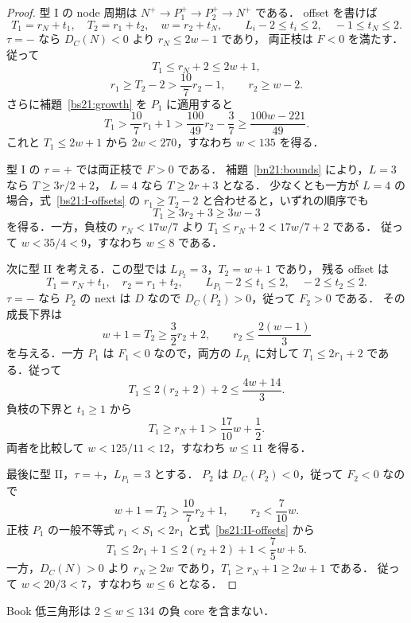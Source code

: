 \begin{proof}
型 I の node 周期は $N^+\to P_1^+\to P_2^+\to N^+$ である．
offset を書けば
\begin{equation}\label{bs21:I-offsets}
 T_1=r_N+t_1,\quad T_2=r_1+t_2,\quad w=r_2+t_N,
 \qquad
 L_i-2\le t_i\le2,\quad-1\le t_N\le2.
\end{equation}
$\tau=-$ なら $D_C(N)<0$ より $r_N\le2w-1$ であり，
両正枝は $F<0$ を満たす．従って
\[
 T_1\le r_N+2\le2w+1,
\]
\[
 r_1\ge T_2-2>\frac{10}{7}r_2-1,
 \qquad r_2\ge w-2.
\]
さらに補題~\ref{bs21:growth} を $P_1$ に適用すると
\[
 T_1>\frac{10}{7}r_1+1
 >\frac{100}{49}r_2-\frac37
 \ge\frac{100w-221}{49}.
\]
これと $T_1\le2w+1$ から $2w<270$，すなわち $w<135$ を得る．

型 I の $\tau=+$ では両正枝で $F>0$ である．
補題~\ref{bn21:bounds} により，$L=3$ なら $T\ge3r/2+2$，
$L=4$ なら $T\ge2r+3$ となる．
少なくとも一方が $L=4$ の場合，式~\eqref{bs21:I-offsets} の
$r_1\ge T_2-2$ と合わせると，いずれの順序でも
\[
 T_1\ge3r_2+3\ge3w-3
\]
を得る．一方，負枝の $r_N<17w/7$ より
$T_1\le r_N+2<17w/7+2$ である．
従って $w<35/4<9$，すなわち $w\le8$ である．

次に型 II を考える．この型では $L_{P_2}=3$，$T_2=w+1$ であり，
残る offset は
\begin{equation}\label{bs21:II-offsets}
 T_1=r_N+t_1,\quad r_2=r_1+t_2,
 \qquad L_{P_1}-2\le t_1\le2,\quad -2\le t_2\le2.
\end{equation}
$\tau=-$ なら $P_2$ の next は $D$ なので $D_C(P_2)>0$，従って $F_2>0$ である．
その成長下界は
\[
 w+1=T_2\ge\frac32r_2+2,
 \qquad r_2\le\frac{2(w-1)}3
\]
を与える．一方 $P_1$ は $F_1<0$ なので，両方の $L_{P_1}$ に対して
$T_1\le2r_1+2$ である．従って
\[
 T_1\le2(r_2+2)+2\le\frac{4w+14}{3}.
\]
負枝の下界と $t_1\ge1$ から
\[
 T_1\ge r_N+1>\frac{17}{10}w+\frac12.
\]
両者を比較して $w<125/11<12$，すなわち $w\le11$ を得る．

最後に型 II，$\tau=+$，$L_{P_1}=3$ とする．
$P_2$ は $D_C(P_2)<0$，従って $F_2<0$ なので
\[
 w+1=T_2>\frac{10}{7}r_2+1,
 \qquad r_2<\frac7{10}w.
\]
正枝 $P_1$ の一般不等式 $r_1<S_1<2r_1$ と式~\eqref{bs21:II-offsets} から
\[
 T_1\le2r_1+1\le2(r_2+2)+1<\frac75w+5.
\]
一方，$D_C(N)>0$ より $r_N\ge2w$ であり，$T_1\ge r_N+1\ge2w+1$ である．
従って $w<20/3<7$，すなわち $w\le6$ となる．
\end{proof}

\begin{lemma}
\label{bs21:finite-certificate}
Book 低三角形は $2\le w\le134$ の負 core を含まない．
\end{lemma}

